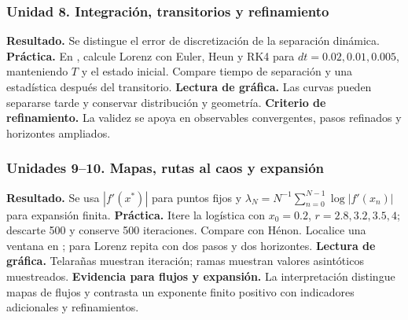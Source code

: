 \subsubsection*{Unidad 8. Integración, transitorios y refinamiento}
\textbf{Resultado.} Se distingue el error de discretización de la separación dinámica.
\textbf{Práctica.} En , calcule Lorenz con Euler, Heun y RK4
para \(dt=0.02,0.01,0.005\), manteniendo \(T\) y el estado inicial. Compare tiempo de
separación y una estadística después del transitorio.
\textbf{Lectura de gráfica.} Las curvas pueden separarse tarde y conservar distribución
y geometría. \textbf{Criterio de refinamiento.} La validez se apoya en observables
convergentes, pasos refinados y horizontes ampliados.

\subsubsection*{Unidades 9--10. Mapas, rutas al caos y expansión}
\textbf{Resultado.} Se usa \(|f'(x^*)|\) para puntos fijos y
\(\lambda_N=N^{-1}\sum_{n=0}^{N-1}\log|f'(x_n)|\) para expansión finita.
\textbf{Práctica.} Itere la logística con \(x_0=0.2\),
\(r=2.8,3.2,3.5,4\); descarte 500 y conserve 500 iteraciones. Compare con Hénon.
Localice una ventana en ; para Lorenz repita  con dos
pasos y dos horizontes. \textbf{Lectura de gráfica.} Telarañas muestran iteración;
ramas muestran valores asintóticos muestreados.
\textbf{Evidencia para flujos y expansión.} La interpretación distingue mapas de
flujos y contrasta un exponente finito positivo con indicadores adicionales y refinamientos.


